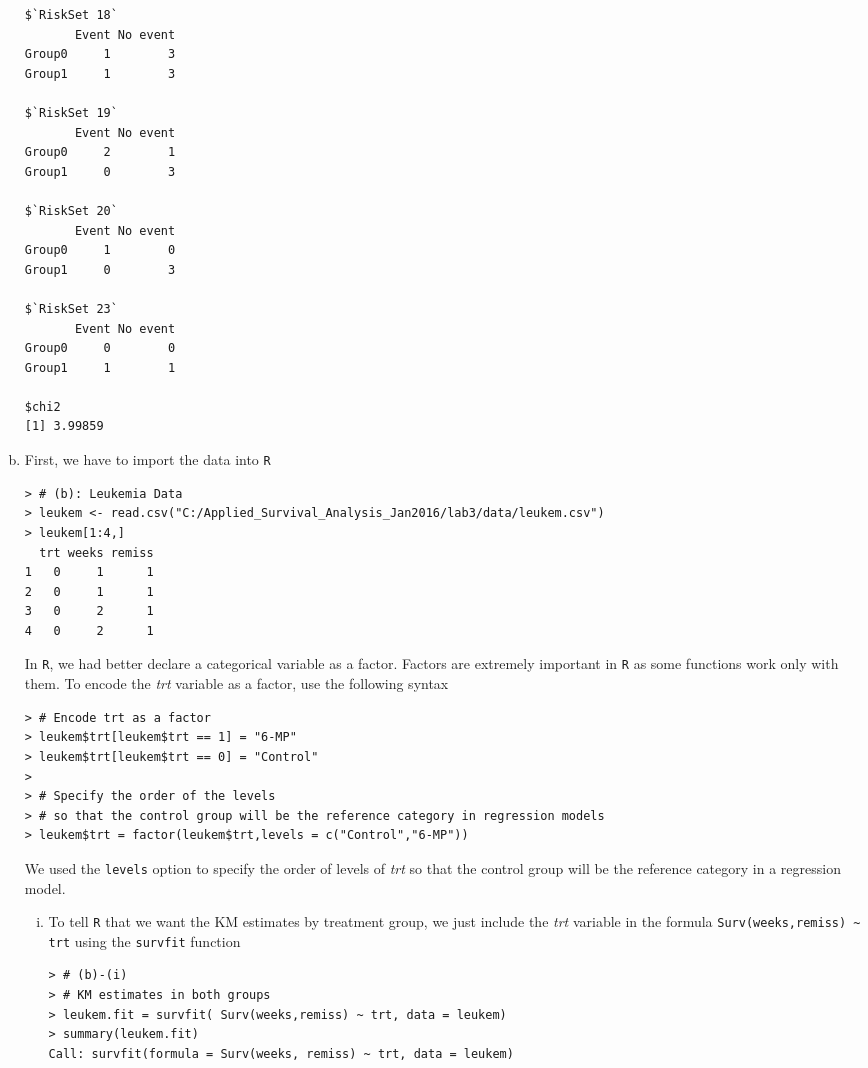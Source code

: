 \begin{enumerate}[(a)]
\begin{footnotesize}
\begin{verbatim}
$`RiskSet 18`
       Event No event
Group0     1        3
Group1     1        3

$`RiskSet 19`
       Event No event
Group0     2        1
Group1     0        3

$`RiskSet 20`
       Event No event
Group0     1        0
Group1     0        3

$`RiskSet 23`
       Event No event
Group0     0        0
Group1     1        1

$chi2
[1] 3.99859
\end{verbatim}
\end{footnotesize}
\item First, we have to import the data into \verb|R|
\begin{footnotesize}
\begin{verbatim}
> # (b): Leukemia Data
> leukem <- read.csv("C:/Applied_Survival_Analysis_Jan2016/lab3/data/leukem.csv")
> leukem[1:4,]
  trt weeks remiss
1   0     1      1
2   0     1      1
3   0     2      1
4   0     2      1
\end{verbatim}
\end{footnotesize}
In \verb|R|, we had better declare a categorical variable as a factor. Factors are extremely important in \verb|R| as some functions work only with them.
 To encode the \emph{trt} variable as a factor, use the following syntax
\begin{footnotesize}
\begin{verbatim}
> # Encode trt as a factor
> leukem$trt[leukem$trt == 1] = "6-MP"
> leukem$trt[leukem$trt == 0] = "Control"
> 
> # Specify the order of the levels
> # so that the control group will be the reference category in regression models
> leukem$trt = factor(leukem$trt,levels = c("Control","6-MP"))
\end{verbatim}
\end{footnotesize}
We used the \verb|levels| option to specify the order of levels of \emph{trt} so that  the control group will be the reference category in a regression model.
\begin{enumerate}[(i)]
\item To tell \verb|R| that we want the KM estimates by treatment group, we just include the \emph{trt} variable in the formula \verb|Surv(weeks,remiss) ~ trt| using the \verb|survfit| function
\begin{footnotesize}
\begin{verbatim}
> # (b)-(i)
> # KM estimates in both groups
> leukem.fit = survfit( Surv(weeks,remiss) ~ trt, data = leukem)
> summary(leukem.fit)
Call: survfit(formula = Surv(weeks, remiss) ~ trt, data = leukem)


\end{verbatim}
\end{footnotesize}
\end{enumerate}
\end{enumerate}
